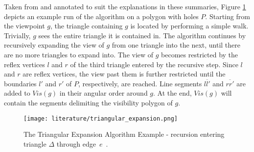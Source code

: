 Taken from \cite{DBLP:journals/corr/BungiuHHHK14} and annotated to suit the explanations in these summaries, Figure \ref{fig:triangular} depicts an example run of the algorithm on a polygon with holes $P$. Starting from the viewpoint $g$, the triangle containing $g$ is located by performing a simple walk. Trivially, $g$ sees the entire triangle it is contained in. The algorithm continues by recursively expanding the view of $g$ from one triangle into the next, until there are no more triangles to expand into. The view of $g$ becomes restricted by the reflex vertices $l$ and $r$ of the third triangle entered by the recursive step. Since $l$ and $r$ are reflex vertices, the view past them is further restricted until the boundaries $l'$ and $r'$ of $P$, respectively,  are reached. Line segments $\overline{ll'}$ and $\overline{rr'}$ are added to $\mathit{Vis}(g)$ in their angular order around $g$. At the end, $\mathit{Vis}(g)$ will contain the segments delimiting the visibility polygon of $g$.

\begin{figure}[h!]
	\centering
	\texttt{[image: literature/triangular\_expansion.png]}
	\caption{The Triangular Expansion Algorithm Example - recursion entering triangle $\Delta$ through edge~$e$~\cite{DBLP:journals/corr/BungiuHHHK14}.}
	\label{fig:triangular}
\end{figure}

